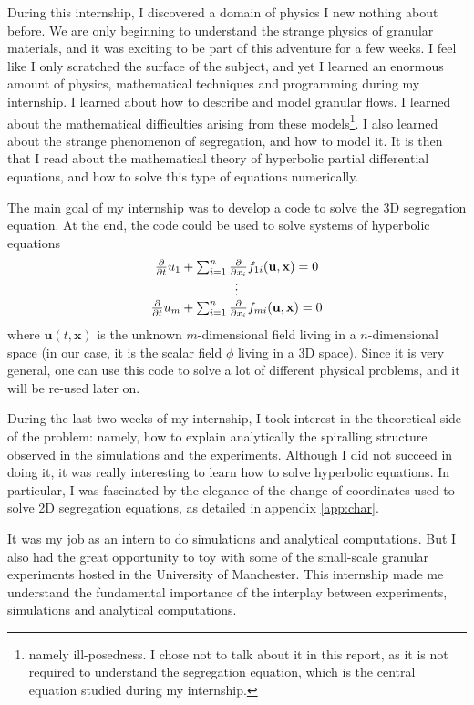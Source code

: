 

During this internship, I discovered a domain of physics I new nothing about before. 
We are only beginning to understand the strange physics of granular materials, and it was exciting to be part of this adventure for a few weeks. I feel like I only scratched the surface of the subject, and yet I learned an enormous amount of physics, mathematical techniques and programming during my internship. 
I learned about how to describe and model granular flows. I learned about the mathematical difficulties arising from these models\footnote{namely ill-posedness. I chose not to talk about it in this report, as it is not required to understand the segregation equation, which is the central equation studied during my internship.}. I also learned about the strange phenomenon of segregation, and how to model it. It is then that I read about the mathematical theory of hyperbolic partial differential equations, and how to solve this type of equations numerically.

The main goal of my internship was to develop a code to solve the 3D segregation equation. 
At the end, the code could be used to solve systems of hyperbolic equations
\begin{equation}
	\begin{matrix}
	\frac{\partial {}}{\partial {t}} u_1 + \sum_{i=1}^n \frac{\partial {}}{\partial {x_i}} f_{1i}(\mathbf{u}, \mathbf{x}) = 0 \\
	\vdots \\
	\frac{\partial {}}{\partial {t}} u_m + \sum_{i=1}^n \frac{\partial {}}{\partial {x_i}} f_{mi}(\mathbf{u}, \mathbf{x}) = 0 \\
\end{matrix}
\end{equation}
where $\mathbf u(t, \mathbf x)$ is the unknown $m$-dimensional field living in a $n$-dimensional space (in our case, it is the scalar field $\phi$ living in a 3D space). Since it is very general, one can use this code to solve a lot of different physical problems, and it will be re-used later on.

During the last two weeks of my internship, I took interest in the theoretical side of the problem: namely, how to explain analytically the spiralling structure observed in the simulations and the experiments. Although I did not succeed in doing it, it was really interesting to learn how to solve hyperbolic equations. In particular, I was fascinated by the elegance of the change of coordinates used to solve 2D segregation equations, as detailed in appendix \ref{app:char}. 

It was my job as an intern to do simulations and analytical computations. But I also had the great opportunity to toy with some of the small-scale granular experiments hosted in the University of Manchester. 
This internship made me understand the fundamental importance of the interplay between experiments, simulations and analytical computations. 
